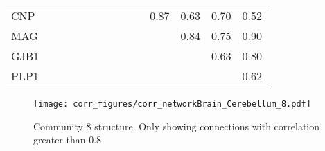 \begin{longtable}{lrrrrrrrrrrrrr}
CNP     &            &               &           &            &             &             &               &             &           &      0.87 &       0.63 &       0.70 &       0.52 \\
MAG     &            &               &           &            &             &             &               &             &           &           &       0.84 &       0.75 &       0.90 \\
GJB1    &            &               &           &            &             &             &               &             &           &           &            &       0.63 &       0.80 \\
PLP1    &            &               &           &            &             &             &               &             &           &           &            &            &       0.62 \\
\end{longtable}


\begin{figure}[h!]
\centering
\texttt{[image: corr\_figures/corr\_networkBrain\_Cerebellum\_8.pdf]}
\caption{Community 8 structure. Only showing connections with correlation greater than 0.8}
\end{figure}




